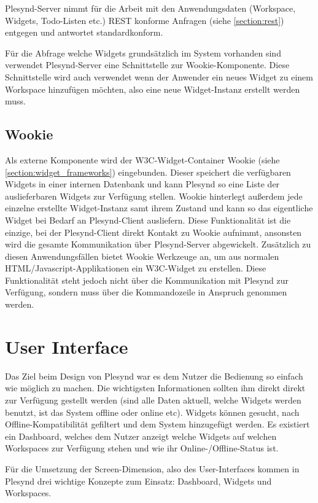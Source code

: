 Plesynd-Server nimmt für die Arbeit mit den Anwendungsdaten (Workspace, Widgets, Todo-Listen etc.) REST konforme Anfragen (siehe \ref{section:rest}) entgegen und antwortet standardkonform.

Für die Abfrage welche Widgets grundsätzlich im System vorhanden sind verwendet Plesynd-Server eine Schnittstelle zur Wookie-Komponente. Diese Schnittstelle wird auch verwendet wenn der Anwender ein neues Widget zu einem Workspace hinzufügen möchten, also eine neue Widget-Instanz erstellt werden muss.

\subsection{Wookie}
Als externe Komponente wird der W3C-Widget-Container Wookie (siehe \ref{section:widget_frameworks}) eingebunden. Dieser speichert die verfügbaren Widgets in einer internen Datenbank und kann Plesynd so eine Liste der auslieferbaren Widgets zur Verfügung stellen. Wookie hinterlegt außerdem jede einzelne erstellte Widget-Instanz samt ihrem Zustand und kann so das eigentliche Widget bei Bedarf an Plesynd-Client ausliefern. Diese Funktionalität ist die einzige, bei der Plesynd-Client direkt Kontakt zu Wookie aufnimmt, ansonsten wird die gesamte Kommunikation über Plesynd-Server abgewickelt. Zusätzlich zu diesen Anwendungsfällen bietet Wookie Werkzeuge an, um aus normalen HTML/Javascript-Applikationen ein W3C-Widget zu erstellen. Diese Funktionalität steht jedoch nicht über die Kommunikation mit Plesynd zur Verfügung, sondern muss über die Kommandozeile in Anspruch genommen werden.

\section{User Interface}\label{section:user_interface}
Das Ziel beim Design von Plesynd war es dem Nutzer die Bedienung so einfach wie möglich zu machen. Die wichtigsten Informationen sollten ihm direkt direkt zur Verfügung gestellt werden (sind alle Daten aktuell, welche Widgets werden benutzt, ist das System offline oder online etc). Widgets können gesucht, nach Offline-Kompatibilität gefiltert und dem System hinzugefügt werden. Es existiert ein Dashboard, welches dem Nutzer anzeigt welche Widgets auf welchen Workspaces zur Verfügung stehen und wie ihr Online-/Offline-Status ist. 

Für die Umsetzung der Screen-Dimension, also des User-Interfaces kommen in Plesynd drei wichtige Konzepte zum Einsatz: Dashboard, Widgets und Workspaces. 

